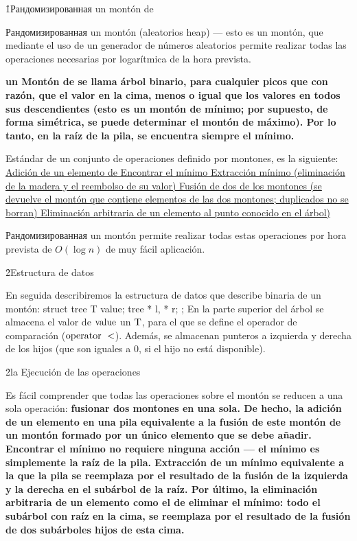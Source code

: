\h1{Рандомизированная un montón de}

Рандомизированная un montón (aleatorios heap) --- esto es un montón, que mediante el uso de un generador de números aleatorios permite realizar todas las operaciones necesarias por logarítmica de la hora prevista.

\bf{un Montón de} se llama árbol binario, para cualquier picos que con razón, que el valor en la cima, menos o igual que los valores en todos sus descendientes (esto es un montón de mínimo; por supuesto, de forma simétrica, se puede determinar el montón de máximo). Por lo tanto, en la raíz de la pila, se encuentra siempre el mínimo.

Estándar de un conjunto de operaciones definido por montones, es la siguiente:
\ul{
\li Adición de un elemento de
\li Encontrar el mínimo
\li Extracción mínimo (eliminación de la madera y el reembolso de su valor)
\li Fusión de dos de los montones (se devuelve el montón que contiene elementos de las dos montones; duplicados no se borran)
\li Eliminación arbitraria de un elemento al punto conocido en el árbol)
}

Рандомизированная un montón permite realizar todas estas operaciones por hora prevista de $O(\log n)$ de muy fácil aplicación.

\h2{Estructura de datos}

En seguida describiremos la estructura de datos que describe binaria de un montón:
\code
struct tree {
T value;
tree * l, * r;
};
\endcode
En la parte superior del árbol se almacena el valor de $\rm value$ un $\rm T$, para el que se define el operador de comparación ($\rm operator\ <$). Además, se almacenan punteros a izquierda y derecha de los hijos (que son iguales a 0, si el hijo no está disponible).

\h2{la Ejecución de las operaciones}

Es fácil comprender que todas las operaciones sobre el montón se reducen a una sola operación: \bf{fusionar} dos montones en una sola. De hecho, la adición de un elemento en una pila equivalente a la fusión de este montón de un montón formado por un único elemento que se debe añadir. Encontrar el mínimo no requiere ninguna acción --- el mínimo es simplemente la raíz de la pila. Extracción de un mínimo equivalente a la que la pila se reemplaza por el resultado de la fusión de la izquierda y la derecha en el subárbol de la raíz. Por último, la eliminación arbitraria de un elemento como el de eliminar el mínimo: todo el subárbol con raíz en la cima, se reemplaza por el resultado de la fusión de dos subárboles hijos de esta cima.

